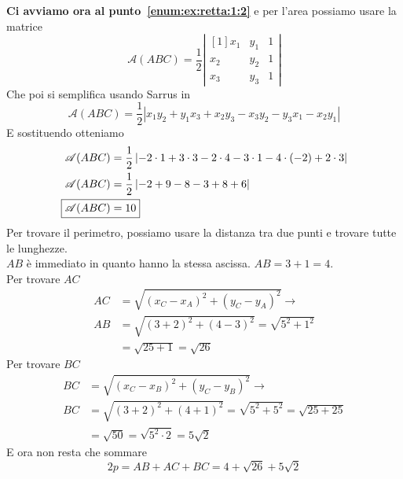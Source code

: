 \textbf{Ci avviamo ora al punto~\ref{enum:ex:retta:1:2}} e per l'area possiamo usare la matrice
\begin{equation*}
\mathscr{A}(ABC) = \frac{1}{2}\left\lvert 
\begin{matrix}[1]
x_1 & y_1 & 1\\
x_2 & y_2 & 1\\
x_3 & y_3 & 1
\end{matrix}\right\rvert
\end{equation*}
Che poi si semplifica usando Sarrus in
\begin{equation*}
\mathscr{A}(ABC) = \frac{1}{2}\left\lvert x_1y_2 + y_1x_3 + x_2y_3 -x_3y_2 -y_3x_1 -x_2y_1\right\rvert
\end{equation*}
E sostituendo otteniamo
\begin{align*}
\mathscr{A}(ABC) &= \frac{1}{2}\left\lvert -2\cdot1 + 3\cdot3 -2\cdot4 -3\cdot1 - 4\cdot(-2) +
2\cdot3\right\rvert\\
\mathscr{A}(ABC) &= \frac{1}{2}\left\lvert -2+9-8-3+8+6\right\rvert\\
\Aboxed{\mathscr{A}(ABC) &= 10}
\end{align*}
Per trovare il perimetro, possiamo usare la distanza tra due punti e trovare tutte le lunghezze.\\
$AB$ è immediato in quanto hanno la stessa ascissa. $\boxed{AB = 3 + 1 = 4}$.\\ [\baselineskip]
Per trovare $AC$
\begin{align*}
AC &= \sqrt{(x_C-x_A)^2+(y_C-y_A)^2} \rightarrow \\
AB &= \sqrt{(3+2)^2 + (4-3)^2} = \sqrt{5^2+1^2} \\
 &= \sqrt{25+1} = \boxed{\sqrt{26}}
\end{align*}
Per trovare $BC$
\begin{align*}
BC &= \sqrt{(x_C-x_B)^2+(y_C-y_B)^2} \rightarrow \\
BC &= \sqrt{(3+2)^2+(4+1)^2} = \sqrt{5^2+5^2} =
\sqrt{25+25} \\
&= \sqrt{50} = \sqrt{5^2\cdot2} = \boxed{5\sqrt{2}}
\end{align*}
E ora non resta che sommare
\begin{equation*}
2p = AB + AC + BC = 4 + \sqrt{26} + 5\sqrt{2}
\end{equation*}

